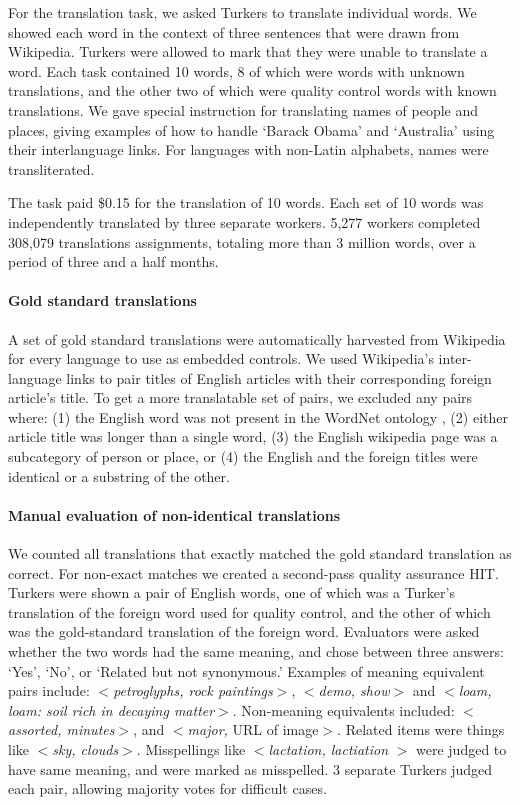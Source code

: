 \documentclass[11pt]{article}
\begin{document}
For the translation task, we asked Turkers to translate individual words.  We showed each word in the context of three sentences that were drawn from Wikipedia.  
Turkers were allowed to mark that they were unable to translate a word. Each task contained 10 words, 8 of which were words with unknown translations, and the other two of which were quality control words with known translations.   
We gave special instruction for translating names of people and places, giving examples of how to handle `Barack Obama' and `Australia' using their interlanguage links. For languages with non-Latin alphabets, names were transliterated. 

The task paid \$0.15 for the translation of 10 words.  
Each set of 10 words was independently translated by three separate workers.  5,277 workers completed 308,079 translations assignments, totaling more than 3 million words, over a period of three and a half months.

\paragraph{Gold standard translations} 
A set of gold standard translations were automatically harvested from Wikipedia  for every language to use as embedded controls. We used Wikipedia's inter-language links to pair titles of English articles with their corresponding foreign article's title.  To get a more translatable set of pairs, we excluded any pairs where: (1) the English word was not present in the WordNet ontology  \cite{miller1995wordnet}, (2) either article title was longer than a single word, (3) the English wikipedia page was a subcategory of person or place, or (4) the English and the foreign titles were identical or a substring of the other.

\paragraph{Manual evaluation of non-identical translations}
We counted all translations that exactly matched the gold standard translation as correct.  For non-exact matches we created a second-pass quality assurance HIT.  
Turkers were shown a pair of English words, one of which was a Turker's translation of the foreign word used for quality control, and the other of which was the gold-standard translation of the foreign word. Evaluators were asked whether the two words had the same meaning, and chose between three answers: `Yes', `No', or `Related but not synonymous.'  Examples of meaning equivalent pairs include: $<${\it petroglyphs, rock paintings}$>$, $<${\it demo, show}$>$ and  $<${\it loam, loam: soil rich in decaying matter}$>$.  Non-meaning equivalents included: $<${\it assorted, minutes}$>$, and $<${\it major,} URL of image$>$.  Related items were things like $<${\it sky, clouds}$>$. Misspellings like $<${\it lactation, lactiation} $>$ were judged to have same meaning, and were marked as misspelled.   3 separate Turkers judged each pair, allowing majority votes for difficult cases. 
\end{document}
